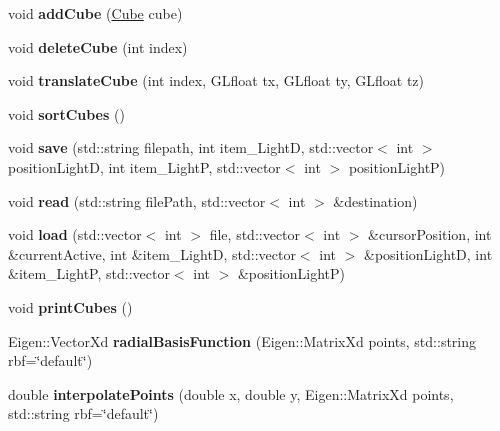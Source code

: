 \begin{DoxyCompactItemize}
\item 
\mbox{\label{classglimac_1_1CubeList_adaa2b032e1ee67cd7dc9feaab94edc6d}} 
void {\bfseries add\+Cube} (\hyperlink{classglimac_1_1Cube}{Cube} cube)
\item 
\mbox{\label{classglimac_1_1CubeList_ac8ffe918d3ff2788edd5c5bbfba45135}} 
void {\bfseries delete\+Cube} (int index)
\item 
\mbox{\label{classglimac_1_1CubeList_ace7f18a7aab16f50e724eab7d66d27b2}} 
void {\bfseries translate\+Cube} (int index, G\+Lfloat tx, G\+Lfloat ty, G\+Lfloat tz)
\item 
\mbox{\label{classglimac_1_1CubeList_af6615c0db1a97fcae5df6f27de71b6d8}} 
void {\bfseries sort\+Cubes} ()
\item 
\mbox{\label{classglimac_1_1CubeList_a9e7ac57439f018d89b71c6071efd48e6}} 
void {\bfseries save} (std\+::string filepath, int item\+\_\+\+LightD, std\+::vector$<$ int $>$ position\+LightD, int item\+\_\+\+LightP, std\+::vector$<$ int $>$ position\+LightP)
\item 
\mbox{\label{classglimac_1_1CubeList_a59d87cac2e218d617940ccdab5235b31}} 
void {\bfseries read} (std\+::string file\+Path, std\+::vector$<$ int $>$ \&destination)
\item 
\mbox{\label{classglimac_1_1CubeList_a6f615ea1238b29f8e19859b528ac6f26}} 
void {\bfseries load} (std\+::vector$<$ int $>$ file, std\+::vector$<$ int $>$ \&cursor\+Position, int \&current\+Active, int \&item\+\_\+\+LightD, std\+::vector$<$ int $>$ \&position\+LightD, int \&item\+\_\+\+LightP, std\+::vector$<$ int $>$ \&position\+LightP)
\item 
\mbox{\label{classglimac_1_1CubeList_a5c3e997708642903eb6b4c806de0cdf9}} 
void {\bfseries print\+Cubes} ()
\item 
\mbox{\label{classglimac_1_1CubeList_a365df432965d53d0ed146fd8bcc270cf}} 
Eigen\+::\+Vector\+Xd {\bfseries radial\+Basis\+Function} (Eigen\+::\+Matrix\+Xd points, std\+::string rbf=\char`\"{}default\char`\"{})
\item 
\mbox{\label{classglimac_1_1CubeList_a183afd5d85506f957281c7092d5b5776}} 
double {\bfseries interpolate\+Points} (double x, double y, Eigen\+::\+Matrix\+Xd points, std\+::string rbf=\char`\"{}default\char`\"{})
\end{DoxyCompactItemize}
